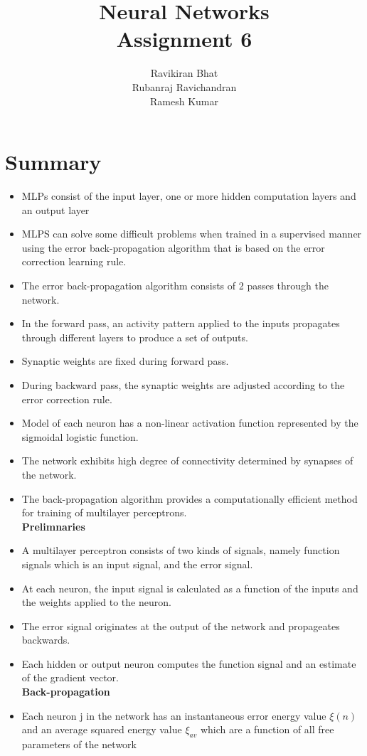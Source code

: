 \documentclass[12pt]{article}
\title{\Huge Neural Networks \\
[6mm]
Assignment 6\\}
\author{Ravikiran Bhat\\
Rubanraj Ravichandran\\
Ramesh Kumar}
\begin{document}
\maketitle
\newpage
\section{Summary}
\begin{itemize}
\item MLPs consist of the input layer, one or more hidden computation layers and an output layer
\item MLPS can solve some difficult problems when trained in a supervised manner using the error back-propagation algorithm that is based on the error correction learning rule.
\item The error back-propagation algorithm consists of 2 passes through the network.
\item In the forward pass, an activity pattern applied to the inputs propagates through different layers to produce a set of outputs.
\item Synaptic weights are fixed during forward pass.
\item During backward pass, the synaptic weights are adjusted according to the error correction rule.
\item Model of each neuron has a non-linear activation function represented by the sigmoidal logistic function.
\item The network exhibits high degree of connectivity determined by synapses of the network.
\item The back-propagation algorithm provides a computationally efficient method for training of multilayer perceptrons.\\
[2mm]
\textbf{Prelimnaries}
\item A multilayer perceptron consists of two kinds of signals, namely function signals which is an input signal, and the error signal.
\item At each neuron, the input signal is calculated as a function of the inputs and the weights applied to the neuron.
\item The error signal originates at the output of the network and propageates backwards.
\item Each hidden or output neuron computes the function signal and an estimate of the gradient vector.\\
[2mm]
\textbf{Back-propagation}
\item Each neuron j in the network has an instantaneous error energy value $\xi (n)$ and an average squared energy value $\xi_{av}$ which are a function of all free parameters of the network

\end{itemize}
\end{document}

